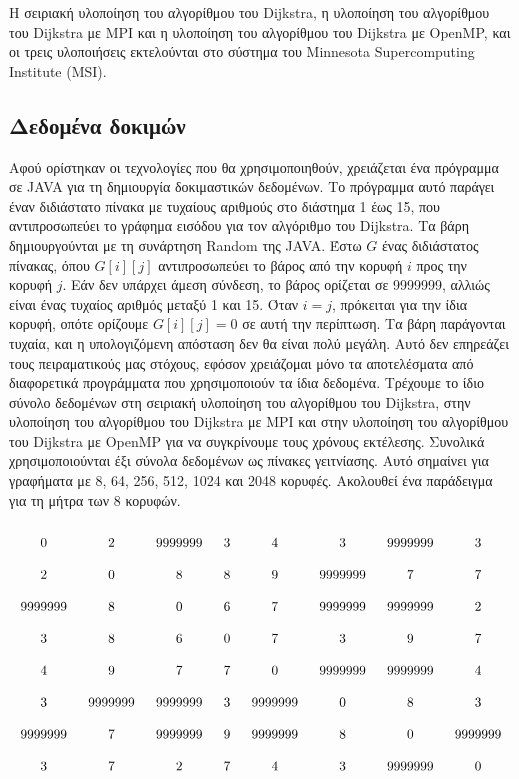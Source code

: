 \documentclass[12pt,a4paper]{article} %
\begin{document}
Η σειριακή υλοποίηση του αλγορίθμου του Dijkstra, η υλοποίηση του αλγορίθμου του Dijkstra με MPI και η υλοποίηση του αλγορίθμου του Dijkstra με
OpenMP, και οι τρεις υλοποιήσεις εκτελούνται στο σύστημα του Minnesota Supercomputing
In\-sti\-tute (MSI).
\vspace{0.2cm}

\subsection{Δεδομένα δοκιμών}
\begin{sloppypar}
Αφού ορίστηκαν οι τεχνολογίες που θα χρησιμοποιηθούν, χρειάζεται ένα πρόγραμμα σε JA\-VA για
τη δημιουργία δοκιμαστικών δεδομένων. Το πρόγραμμα αυτό παράγει έναν διδιάστατο πίνακα
με τυχαίους αριθμούς στο διάστημα 1 έως 15, που αντιπροσωπεύει το γράφημα εισόδου για τον
αλγόριθμο του Dijkstra. Τα βάρη δημιουργούνται με τη συνάρτηση Random της JAVA. Έστω
$G$ ένας διδιάστατος πίνακας, όπου $G[i][j]$ αντιπροσωπεύει το βάρος από την κορυφή $i$ προς
την κορυφή $j$. Εάν δεν υπάρχει άμεση σύνδεση, το βάρος ορίζεται σε 9999999, αλλιώς είναι
ένας τυχαίος αριθμός μεταξύ 1 και 15. Όταν $i = j$, πρόκειται για την ίδια κορυφή, οπότε
ορίζουμε $G[i][j] = 0$ σε αυτή την περίπτωση. Τα βάρη παράγονται τυχαία, και η υπολογιζόμενη
απόσταση δεν θα είναι πολύ μεγάλη. Αυτό δεν επηρεάζει τους πειραματικούς μας στόχους,
εφόσον χρειάζομαι μόνο τα αποτελέσματα από διαφορετικά προγράμματα που χρησιμοποιούν τα
ίδια δεδομένα. Τρέχουμε το ίδιο σύνολο δεδομένων στη σειριακή υλοποίηση του αλγορίθμου του Dijkstra, στην υλοποίηση του αλγορίθμου του Dijkstra με MPI και στην υλοποίηση του αλγορίθμου του Dijkstra με
OpenMP για να συγκρίνουμε τους χρόνους εκτέλεσης. Συνολικά
χρησιμοποιούνται έξι σύνολα δεδομένων ως πίνακες γειτνίασης. Αυτό σημαίνει για γραφήματα με 8, 64, 256,
512, 1024 και 2048 κορυφές. Ακολουθεί ένα παράδειγμα για τη μήτρα των 8 κορυφών.
\vspace{0.3cm}
\end{sloppypar}
\[
    \begingroup
    \setlength{\arraycolsep}{8pt}%
    \renewcommand{\arraystretch}{2}%
    \begin{array}{cccccccc}
        0 & 2 & 9999999 & 3 & 4 & 3 & 9999999 & 3 \\
        2 & 0 & 8 & 8 & 9 & 9999999 & 7 & 7 \\
        9999999 & 8 & 0 & 6 & 7 & 9999999 & 9999999 & 2 \\
        3 & 8 & 6 & 0 & 7 & 3 & 9 & 7 \\
        4 & 9 & 7 & 7 & 0 & 9999999 & 9999999 & 4 \\
        3 & 9999999 & 9999999 & 3 & 9999999 & 0 & 8 & 3 \\
        9999999 & 7 & 9999999 & 9 & 9999999 & 8 & 0 & 9999999 \\
        3 & 7 & 2 & 7 & 4 & 3 & 9999999 & 0 \\
    \end{array}
    \endgroup
\]
\vspace{0.3cm}
\end{document}
